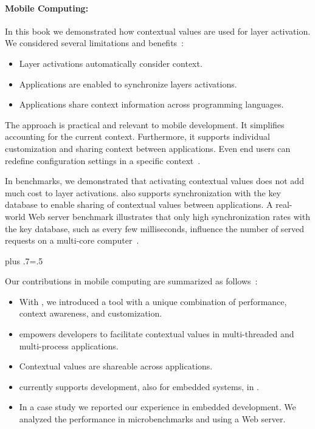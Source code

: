 \paragraph{Mobile Computing:}


In this book we demonstrated how contextual values are used for layer activation.
We considered several limitations and benefits~\cite{raab2016persistent}:
\begin{itemize}
\item Layer activations automatically consider context.
\item Applications are enabled to synchronize layers activations.
\item Applications share context information across programming languages.
\end{itemize}


The approach is practical and relevant to mobile development.
It simplifies accounting for the current context.
Furthermore, it supports individual customization and sharing context between applications.
Even end users can redefine configuration settings in a specific context~\cite{raab2016persistent}.

In benchmarks, we demonstrated that activating contextual values does not add much cost to layer activations.
\elektra{} also supports synchronization with the key database to enable sharing of contextual values between applications.
A real-world Web server benchmark illustrates that only high synchronization rates with the key database, such as every few milliseconds, influence the number of served requests on a multi-core computer~\cite{raab2016persistent}.%
{\parfillskip=0pt plus .7\textwidth \emergencystretch=.5\textwidth \par}

Our contributions in mobile computing are summarized as follows~\cite{raab2016persistent}:
\begin{itemize}
\item With \elektra{}, we introduced a tool with a unique combination of performance, context awareness, and customization.
\item \elektra{} empowers developers to facilitate contextual values in multi-threaded and multi-process applications.
\item Contextual values are shareable across applications.
\item \elektra{} currently supports development, also for embedded systems, in \supportedbindings.
\item In a case study we reported our experience in embedded development.
	We analyzed the performance in microbenchmarks and using a Web server.
\end{itemize}

